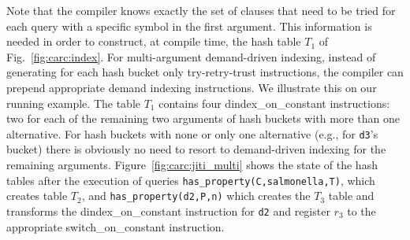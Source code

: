 \documentclass{llncs}
\newcommand{\code}[1]{\texttt{#1}}
\newcommand{\instr}[1]{\textsf{#1}}
\newcommand{\TryRetryTrust}{\mbox{\instr{try-retry-trust}}\xspace}
\newcommand{\jitiONconstant}{\mbox{\instr{dindex\_on\_constant}}\xspace}
\newcommand{\switchONconstant}{\mbox{\instr{switch\_on\_constant}}\xspace}
\newcommand{\JITI}{demand-driven indexing\xspace}
\begin{document}
Note that the compiler knows exactly the set of clauses that need to
be tried for each query with a specific symbol in the first argument.
This information is needed in order to construct, at compile time, the
hash table $T_1$ of Fig.~\ref{fig:carc:index}. For multi-argument
\JITI, instead of generating for each hash bucket only \TryRetryTrust
instructions, the compiler can prepend appropriate demand indexing
instructions. We illustrate this on our running example. The table
$T_1$ contains four \jitiONconstant instructions: two for each of the
remaining two arguments of hash buckets with more than one
alternative. For hash buckets with none or only one alternative (e.g.,
for \code{d3}'s bucket) there is obviously no need to resort to \JITI
for the remaining arguments. Figure~\ref{fig:carc:jiti_multi} shows
the state of the hash tables after the execution of queries
\code{has\_property(C,salmonella,T)}, which creates table $T_2$, and
\code{has\_property(d2,P,n)} which creates the $T_3$ table and
transforms the \jitiONconstant instruction for \code{d2} and register
$r_3$ to the appropriate \switchONconstant instruction.
\end{document}
